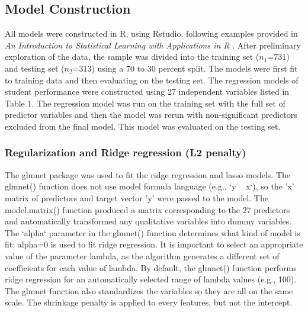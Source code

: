 \documentclass[sigconf]{acmart}
\begin{document}

\subsection{Model Construction}

All models were constructed in R, using Rstudio, following examples provided 
in \emph{An Introduction to Statistical Learning with Applications in R} 
\cite{jamesetal13}. After preliminary exploration of the data, the sample was 
divided into the training set ($n_1$=731) and testing set ($n_2$=313) using 
a 70 to 30 percent split. The models were first fit to training data and then
evaluating on the testing set. The regression models of student performance
were constructed using 27 independent variables listed in Table 1. The
regression model was run on the training set with the full set of predictor 
variables and then the model was rerun with non-significant predictors 
excluded from the final model. This model was evaluated on the testing set. 


\subsubsection{Regularization and Ridge regression (L2 penalty)} 

The glmnet package was used to fit the ridge regression and lasso models. 
The glmnet() function does not use model formula language (e.g., `y ~ x`), 
so the 'x' matrix of predictors and target vector 'y' were passed to the 
model. The model.matrix() function produced a matrix corresponding to the 
27 predictors and automatically transformed any qualitative variables into
dummy variables. The `alpha` parameter in the glmnet() function determines 
what kind of model is fit: alpha=0 is used to fit ridge regression. It is
important to select an appropriate value of the parameter lambda, as the
algorithm generates a different set of coefficients for each value of 
lambda. By default, the glmnet() function performs ridge regression for an 
automatically selected range of lambda values (e.g., 100). The glmnet 
function also standardizes the variables so they are all on the same scale.
The shrinkage penalty is applied to every features, but not the intercept. 

\end{document}
